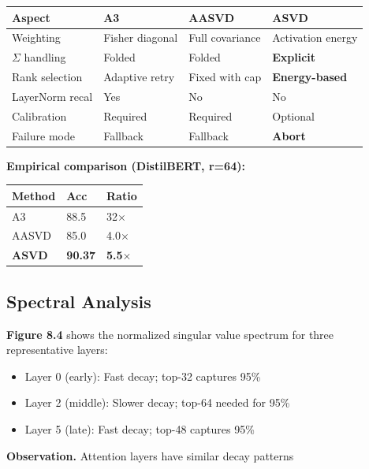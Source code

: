 \begin{table}[H]
\centering
\small
\begin{tabular}{llll}
\toprule
\textbf{Aspect} & \textbf{A3} & \textbf{AASVD} & \textbf{ASVD} \\
\midrule
Weighting & Fisher diagonal & Full covariance & Activation energy \\
$\Sigma$ handling & Folded & Folded & \textbf{Explicit} \\
Rank selection & Adaptive retry & Fixed with cap & \textbf{Energy-based} \\
LayerNorm recal & Yes & No & No \\
Calibration & Required & Required & Optional \\
Failure mode & Fallback & Fallback & \textbf{Abort} \\
\bottomrule
\end{tabular}
\end{table}

\textbf{Empirical comparison (DistilBERT, r=64):}

\begin{table}[H]
\centering
\small
\begin{tabular}{lll}
\toprule
\textbf{Method} & \textbf{Acc} & \textbf{Ratio} \\
\midrule
A3 & 88.5 & 32$\times$ \\
AASVD & 85.0 & 4.0$\times$ \\
\textbf{ASVD} & \textbf{90.37} & \textbf{5.5$\times$} \\
\bottomrule
\end{tabular}
\end{table}

\subsection{Spectral Analysis}

\textbf{Figure 8.4} shows the normalized singular value spectrum for three 
representative layers:

\begin{itemize}
\item Layer 0 (early): Fast decay; top-32 captures 95\%
\item Layer 2 (middle): Slower decay; top-64 needed for 95\%
\item Layer 5 (late): Fast decay; top-48 captures 95\%

\end{itemize}
\textbf{Observation.} Attention layers have similar decay patterns

